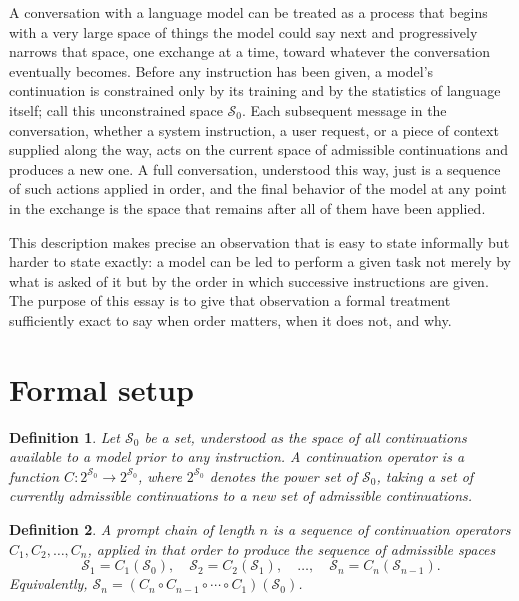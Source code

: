 \documentclass[11pt]{article}
\newtheorem{definition}{Definition}
\begin{document}
A conversation with a language model can be treated as a process that begins with a very large space of things the model could say next and progressively narrows that space, one exchange at a time, toward whatever the conversation eventually becomes. Before any instruction has been given, a model's continuation is constrained only by its training and by the statistics of language itself; call this unconstrained space $\mathcal{S}_0$. Each subsequent message in the conversation, whether a system instruction, a user request, or a piece of context supplied along the way, acts on the current space of admissible continuations and produces a new one. A full conversation, understood this way, just is a sequence of such actions applied in order, and the final behavior of the model at any point in the exchange is the space that remains after all of them have been applied.

This description makes precise an observation that is easy to state informally but harder to state exactly: a model can be led to perform a given task not merely by what is asked of it but by the order in which successive instructions are given. The purpose of this essay is to give that observation a formal treatment sufficiently exact to say when order matters, when it does not, and why.

\section{Formal setup}

\begin{definition}
Let $\mathcal{S}_0$ be a set, understood as the space of all continuations available to a model prior to any instruction. A \emph{continuation operator} is a function $C : 2^{\mathcal{S}_0} \to 2^{\mathcal{S}_0}$, where $2^{\mathcal{S}_0}$ denotes the power set of $\mathcal{S}_0$, taking a set of currently admissible continuations to a new set of admissible continuations.
\end{definition}

\begin{definition}
A \emph{prompt chain} of length $n$ is a sequence of continuation operators $C_1, C_2, \ldots, C_n$, applied in that order to produce the sequence of admissible spaces
\[
\mathcal{S}_1 = C_1(\mathcal{S}_0), \quad \mathcal{S}_2 = C_2(\mathcal{S}_1), \quad \ldots, \quad \mathcal{S}_n = C_n(\mathcal{S}_{n-1}).
\]
Equivalently, $\mathcal{S}_n = (C_n \circ C_{n-1} \circ \cdots \circ C_1)(\mathcal{S}_0)$.
\end{definition}
\end{document}
